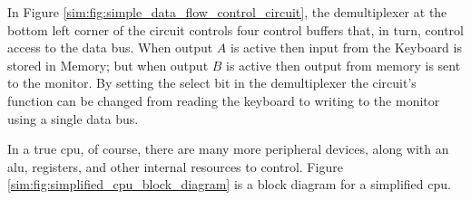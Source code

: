 \begin{figure}[H]
\end{figure}

In Figure \ref{sim:fig:simple_data_flow_control_circuit}, the demultiplexer at the bottom left corner of the circuit controls four control buffers that, in turn, control access to the data bus. When output $ A $ is active then input from the Keyboard is stored in Memory; but when output $ B $ is active then output from memory is sent to the monitor. By setting the select bit in the demultiplexer the circuit's function can be changed from reading the keyboard to writing to the monitor using a single data bus.

In a true \gls{cpu}, of course, there are many more peripheral devices, along with an \gls{alu}, registers, and other internal resources to control. Figure \ref{sim:fig:simplified_cpu_block_diagram} is a block diagram for a simplified \gls{cpu}.

